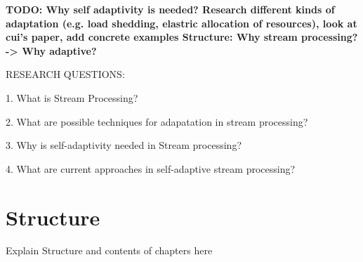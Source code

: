\textbf{TODO: Why self adaptivity is needed? Research different kinds of adaptation (e.g. load shedding, elastric allocation of resources), look at cui's paper, add concrete examples
Structure:
Why stream processing? -> Why adaptive?}

RESEARCH QUESTIONS:

1. What is Stream Processing?

2. What are possible techniques for adapatation in stream processing?

3. Why is self-adaptivity needed in Stream processing?

4. What are current approaches in self-adaptive stream processing?


\section{Structure}
\label{sec:structure}
Explain Structure and contents of chapters here